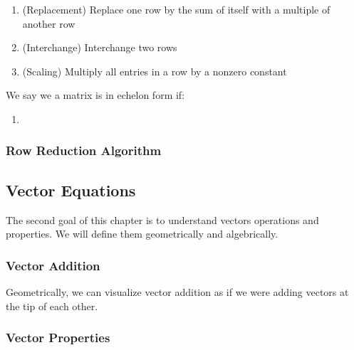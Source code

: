 \documentclass{article}
\begin{document}
\begin{enumerate}
    \item (Replacement) Replace one row by the sum of itself with a multiple
	of another row
    \item (Interchange) Interchange two rows
    \item (Scaling) Multiply all entries in a row by a nonzero constant
\end{enumerate}

\begin{definition}[Pivot]
\end{definition}

\begin{definition}
\end{definition}

\begin{definition}
    We say we a matrix is in echelon form if:
    \begin{enumerate}
	\item
    \end{enumerate}
\end{definition}

\begin{definition}

\end{definition}

\subsubsection{Row Reduction Algorithm}

\subsection{Vector Equations}

The second goal of this chapter is to understand vectors operations and properties.
We will define them geometrically and algebrically.

\subsubsection{Vector Addition}

Geometrically, we can visualize vector addition as if we were adding vectors
at the tip of each other.

\subsubsection{Vector Properties}
\end{document}
